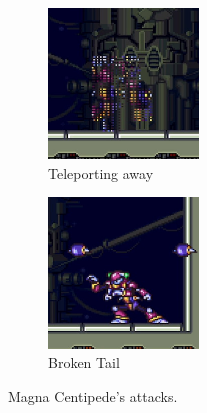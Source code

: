 \begin{figure}[htp]
	\begin{subfigure}{0.4\linewidth}
		\centering
		\includegraphics[height=4cm]{figures/X2/Magna_centipede/Centipede_teleport.png}
		\caption{Teleporting away}
	\end{subfigure}
	\begin{subfigure}{0.4\linewidth}
		\centering
		\includegraphics[height=4cm]{figures/X2/Magna_centipede/Centipede_no_tail.png}
		\caption{Broken Tail}
	\end{subfigure}
		\caption{Magna Centipede's attacks.}	
\end{figure}

